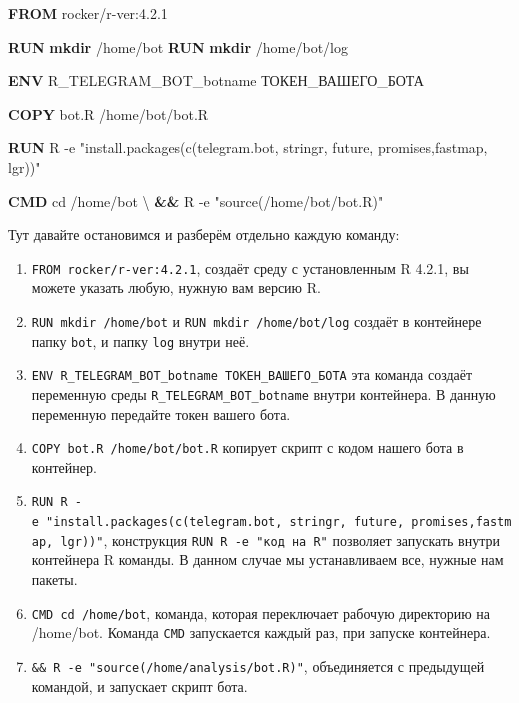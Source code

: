 \documentclass[
]{book}
\newenvironment{Shaded}{\begin{snugshade}}{\end{snugshade}}
\newcommand{\AttributeTok}[1]{\textcolor[rgb]{0.13,0.29,0.53}{#1}}
\newcommand{\BuiltInTok}[1]{#1}
\newcommand{\DataTypeTok}[1]{\textcolor[rgb]{0.13,0.29,0.53}{#1}}
\newcommand{\ExtensionTok}[1]{#1}
\newcommand{\FunctionTok}[1]{\textcolor[rgb]{0.13,0.29,0.53}{\textbf{#1}}}
\newcommand{\KeywordTok}[1]{\textcolor[rgb]{0.13,0.29,0.53}{\textbf{#1}}}
\newcommand{\NormalTok}[1]{#1}
\newcommand{\StringTok}[1]{\textcolor[rgb]{0.31,0.60,0.02}{#1}}
\providecommand{\tightlist}{%
  \setlength{\itemsep}{0pt}\setlength{\parskip}{0pt}}
\begin{document}
\begin{Shaded}
\begin{Highlighting}[]
\KeywordTok{FROM}\NormalTok{ rocker/r{-}ver:4.2.1}

\KeywordTok{RUN} \FunctionTok{mkdir}\NormalTok{ /home/bot}
\KeywordTok{RUN} \FunctionTok{mkdir}\NormalTok{ /home/bot/log}

\KeywordTok{ENV}\NormalTok{ R\_TELEGRAM\_BOT\_botname ТОКЕН\_ВАШЕГО\_БОТА}

\KeywordTok{COPY}\NormalTok{ bot.R /home/bot/bot.R}

\KeywordTok{RUN} \ExtensionTok{R} \AttributeTok{{-}e} \StringTok{"install.packages(c(\textquotesingle{}telegram.bot\textquotesingle{}, \textquotesingle{}stringr\textquotesingle{}, \textquotesingle{}future\textquotesingle{}, \textquotesingle{}promises\textquotesingle{},\textquotesingle{}fastmap\textquotesingle{}, \textquotesingle{}lgr\textquotesingle{}))"}

\KeywordTok{CMD} \BuiltInTok{cd}\NormalTok{ /home/bot }\DataTypeTok{\textbackslash{}}
  \KeywordTok{\&\&}  \ExtensionTok{R} \AttributeTok{{-}e} \StringTok{"source(\textquotesingle{}/home/bot/bot.R\textquotesingle{})"}
\end{Highlighting}
\end{Shaded}

Тут давайте остановимся и разберём отдельно каждую команду:

\begin{enumerate}
\def\labelenumi{\arabic{enumi}.}
\tightlist
\item
  \texttt{FROM\ rocker/r-ver:4.2.1}, создаёт среду с установленным R 4.2.1, вы можете указать любую, нужную вам версию R.
\item
  \texttt{RUN\ mkdir\ /home/bot} и \texttt{RUN\ mkdir\ /home/bot/log} создаёт в контейнере папку \texttt{bot}, и папку \texttt{log} внутри неё.
\item
  \texttt{ENV\ R\_TELEGRAM\_BOT\_botname\ ТОКЕН\_ВАШЕГО\_БОТА} эта команда создаёт переменную среды \texttt{R\_TELEGRAM\_BOT\_botname} внутри контейнера. В данную переменную передайте токен вашего бота.
\item
  \texttt{COPY\ bot.R\ /home/bot/bot.R} копирует скрипт с кодом нашего бота в контейнер.
\item
  \texttt{RUN\ R\ -e\ "install.packages(c(\textquotesingle{}telegram.bot\textquotesingle{},\ \textquotesingle{}stringr\textquotesingle{},\ \textquotesingle{}future\textquotesingle{},\ \textquotesingle{}promises\textquotesingle{},\textquotesingle{}fastmap\textquotesingle{},\ \textquotesingle{}lgr\textquotesingle{}))"}, конструкция \texttt{RUN\ R\ -e\ "код\ на\ R"} позволяет запускать внутри контейнера R команды. В данном случае мы устанавливаем все, нужные нам пакеты.
\item
  \texttt{CMD\ cd\ /home/bot}, команда, которая переключает рабочую директорию на /home/bot. Команда \texttt{CMD} запускается каждый раз, при запуске контейнера.
\item
  \texttt{\&\&\ R\ -e\ "source(\textquotesingle{}/home/analysis/bot.R\textquotesingle{})"}, объединяется с предыдущей командой, и запускает скрипт бота.
\end{enumerate}
\end{document}
